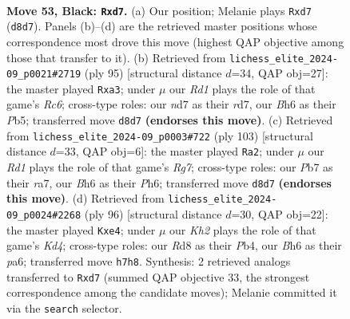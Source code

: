 \documentclass[11pt]{article}
\begin{document}
\clearpage

\begin{figure}[p]\centering
\begin{subfigure}{0.46\textwidth}\centering
\resizebox{\linewidth}{!}{%
\newchessgame
\chessboard[
  setfen={3r4/1p1N3k/5Kpb/5p1p/P7/6PP/4r3/8 b - - 3 53},
  showmover=false,
  pgfstyle=straightmove, color=movearrow, markmove={d8-d7}
]}
\caption{}
\end{subfigure}\hfill
\begin{subfigure}{0.46\textwidth}\centering
\resizebox{\linewidth}{!}{%
\newchessgame
\chessboard[
  setfen={8/3R1Kpk/p4p1p/1p3P2/1P6/P1r3P1/8/8 b - - 2 48},
  showmover=false,
  pgfstyle=straightmove, color=movearrow, markmove={c3-a3}
]}
\caption{}
\end{subfigure}
\\[4pt]
\begin{subfigure}{0.46\textwidth}\centering
\resizebox{\linewidth}{!}{%
\newchessgame
\chessboard[
  setfen={4r1k1/R5p1/2p3Np/p1Pp1P2/7P/3K4/6r1/8 b - - 2 52},
  showmover=false,
  pgfstyle=straightmove, color=movearrow, markmove={g2-a2}
]}
\caption{}
\end{subfigure}\hfill
\begin{subfigure}{0.46\textwidth}\centering
\resizebox{\linewidth}{!}{%
\newchessgame
\chessboard[
  setfen={1b6/4N3/p7/2P3pp/1P1Kp3/6kP/6P1/8 w - - 10 49},
  showmover=false,
  pgfstyle=straightmove, color=movearrow, markmove={d4-e4}
]}
\caption{}
\end{subfigure}
\caption{\textbf{Move 53, Black: \texttt{Rxd7}.} (a) Our position; Melanie plays \texttt{Rxd7} (\texttt{d8d7}). Panels (b)--(d) are the retrieved master positions whose correspondence most drove this move (highest QAP objective among those that transfer to it). (b) Retrieved from \texttt{lichess\_elite\_2024-09\_p0021\#2719} (ply 95) [structural distance $d$=34, QAP obj=27]: the master played \texttt{Rxa3}; under $\mu$ our \emph{Rd1} plays the role of that game's \emph{Rc6}; cross-type roles: our \emph{n}d7 as their \emph{r}d7, our \emph{B}h6 as their \emph{P}b5; transferred move \texttt{d8d7} \textbf{(endorses this move)}. (c) Retrieved from \texttt{lichess\_elite\_2024-09\_p0003\#722} (ply 103) [structural distance $d$=33, QAP obj=6]: the master played \texttt{Ra2}; under $\mu$ our \emph{Rd1} plays the role of that game's \emph{Rg7}; cross-type roles: our \emph{P}b7 as their \emph{r}a7, our \emph{B}h6 as their \emph{P}h6; transferred move \texttt{d8d7} \textbf{(endorses this move)}. (d) Retrieved from \texttt{lichess\_elite\_2024-09\_p0024\#2268} (ply 96) [structural distance $d$=30, QAP obj=22]: the master played \texttt{Kxe4}; under $\mu$ our \emph{Kh2} plays the role of that game's \emph{Kd4}; cross-type roles: our \emph{R}d8 as their \emph{P}b4, our \emph{B}h6 as their \emph{p}a6; transferred move \texttt{h7h8}. Synthesis: 2 retrieved analogs transferred to \texttt{Rxd7} (summed QAP objective 33, the strongest correspondence among the candidate moves); Melanie committed it via the \texttt{search} selector.}
\label{fig:thought-m105}
\end{figure}
\end{document}

